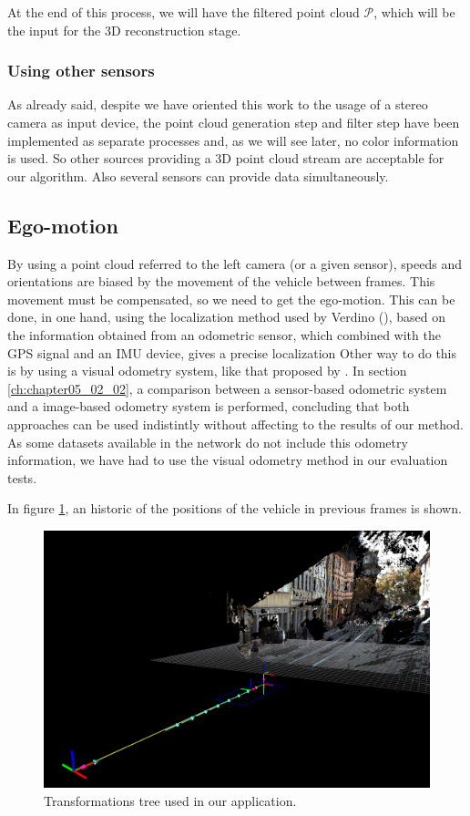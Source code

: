 At the end of this process, we will have the filtered point cloud $\mathcal{P}$, which will be the input for the 3D reconstruction stage.

\subsubsection{Using other sensors}\label{ch:chapter05_01_01_02}

As already said, despite we have oriented this work to the usage of a stereo camera as input device, the point cloud generation step and filter step have been implemented as separate processes and, as we will see later, no color information is used. So other sources providing a 3D point cloud stream are acceptable for our algorithm. Also several sensors can provide data simultaneously.

\subsection{Ego-motion}\label{ch:chapter05_01_02}

By using a point cloud referred to the left camera (or a given sensor), speeds and orientations are biased by the movement of the vehicle between frames. This movement must be compensated, so we need to get the ego-motion. This can be done, in one hand, using the localization method used by Verdino (\cite{Perea2013mcl}), based on the information obtained from an odometric sensor, which combined with the \ac{GPS} signal and an \ac{IMU} device, gives a precise localization Other way to do this is by using a visual odometry system, like that proposed by \cite{geiger2011stereoscan}. In section \ref{ch:chapter05_02_02}, a comparison between a sensor-based odometric system and a image-based odometry system is performed, concluding that both approaches can be used indistintly without affecting to the results of our method. As some datasets available in the network do not include this odometry information, we have had to use the visual odometry method in our evaluation tests.

In figure \ref{fig:cp05_tfs}, an historic of the positions of the vehicle in previous frames is shown.

\begin{figure}[t]
  \centering
  \includegraphics{tfs}
  \caption{Transformations tree used in our application.}\label{fig:cp05_tfs}
\end{figure}

